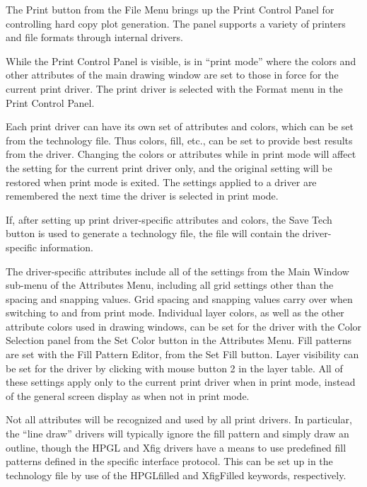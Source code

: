 The {\cb Print} button from the {\cb File Menu} brings up the {\cb
Print Control Panel} for controlling hard copy plot generation.  The
panel supports a variety of printers and file formats through internal
drivers.

While the {\cb Print Control Panel} is visible, {\Xic} is in ``print
mode'' where the colors and other attributes of the main drawing
window are set to those in force for the current print driver.  The
print driver is selected with the {\cb Format} menu in the {\cb Print
Control Panel}.

Each print driver can have its own set of attributes and colors, which
can be set from the technology file.  Thus colors, fill, etc., can be
set to provide best results from the driver.  Changing the colors or
attributes while in print mode will affect the setting for the current
print driver only, and the original setting will be restored when
print mode is exited.  The settings applied to a driver are remembered
the next time the driver is selected in print mode.

If, after setting up print driver-specific attributes and colors, the
{\cb Save Tech} button is used to generate a technology file, the file
will contain the driver-specific information.

The driver-specific attributes include all of the settings from the
{\cb Main Window} sub-menu of the {\cb Attributes Menu}, including all
grid settings other than the spacing and snapping values.  Grid
spacing and snapping values carry over when switching to and from
print mode.  Individual layer colors, as well as the other attribute
colors used in drawing windows, can be set for the driver with the
{\cb Color Selection} panel from the {\cb Set Color} button in the
{\cb Attributes Menu}.  Fill patterns are set with the {\cb Fill
Pattern Editor}, from the {\cb Set Fill} button.  Layer visibility can
be set for the driver by clicking with mouse button 2 in the layer
table.  All of these settings apply only to the current print driver
when in print mode, instead of the general screen display as when not
in print mode.

Not all attributes will be recognized and used by all print drivers. 
In particular, the ``line draw'' drivers will typically ignore the
fill pattern and simply draw an outline, though the HPGL and Xfig
drivers have a means to use predefined fill patterns defined in the
specific interface protocol.  This can be set up in the technology
file by use of the {\vt HPGLfilled} and {\vt XfigFilled} keywords,
respectively.

